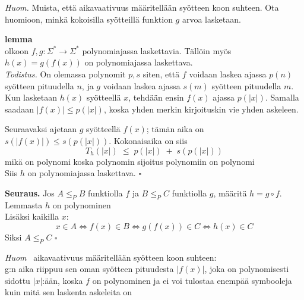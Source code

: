\documentclass[12pt,a4paper]{article}
\begin{document}
{\em Huom.}
Muista, että aikavaativuus määritellään
syötteen koon suhteen.
Ota huomioon, minkä kokoisilla syötteillä funktion
$g$ arvoa lasketaan.

\bigskip




{\bf lemma}\\
olkoon $f,g:\Sigma^*\to\Sigma^*$ polynomiajassa laskettavia.
Tällöin myös $h(x)=g(f(x))$ on polynomiajassa laskettava.\\

\emph{Todistus.}
On olemassa polynomit $p,s$ siten, että $f$ voidaan laskea ajassa $p(n)$
syötteen pituudella $n$, ja $g$ voidaan laskea ajassa $s(m)$ syötteen
pituudella $m$.\\

Kun lasketaan $h(x)$ syötteellä $x$, tehdään ensin $f(x)$ ajassa $p(|x|)$.
Samalla saadaan $\lvert f(x)\rvert \le p(|x|)$, koska yhden merkin kirjoituskin
vie yhden askeleen.

Seuraavaksi ajetaan $g$ syötteellä $f(x)$; tämän aika on
$s(\lvert f(x)\rvert)\le s(p(|x|))$.
Kokonaisaika on siis
\[
T_h(|x|) \;\le\; p(|x|)\;+\;s(p(|x|))
\]
mikä on polynomi koska polynomin sijoitus polynomiin on polynomi \\

Siis $h$ on polynomiajassa laskettava. \quad \(\square\)

\bigskip
\textbf{Seuraus.}
Jos $A\le_P B$ funktiolla $f$ ja $B\le_P C$ funktiolla $g$, määritä $h=g\circ f$.
Lemmasta $h$ on polynominen\\
 Lisäksi kaikilla $x$:
\[
x\in A \iff f(x)\in B \iff g(f(x))\in C \iff h(x)\in C
\]
Siksi $A\le_P C$ \quad \(\square\)

\medskip
\emph{Huom} \Rightarrow\, aikavaativuus määritellään syötteen koon suhteen:\\

g:n aika riippuu sen oman syötteen pituudesta $|f(x)|$, joka on
polynomisesti sidottu $|x|$:ään, koska $f$ on polynominen ja ei voi tulostaa
enempää symbooleja kuin mitä sen laskenta askeleita on
\end{document}
